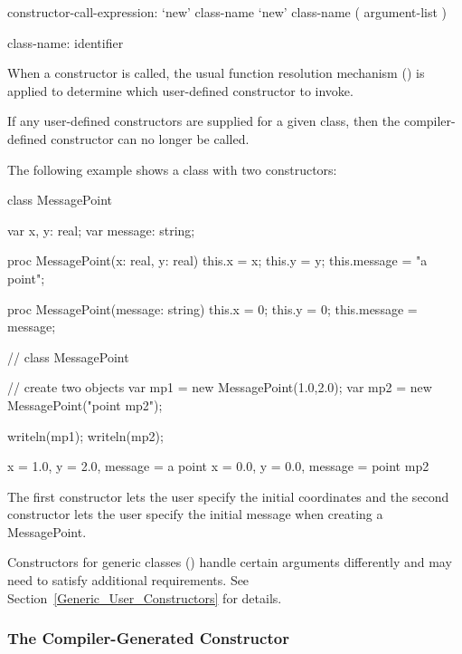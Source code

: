 \begin{syntax}
constructor-call-expression:
  `new' class-name
  `new' class-name ( argument-list )

class-name:
  identifier
\end{syntax}

When a constructor is called, the usual function resolution mechanism
() is applied to determine which
user-defined constructor to invoke.

If any user-defined constructors are supplied for a given class, then the
compiler-defined constructor can no longer be called.

\begin{example}
The following example shows a class with two constructors:
\begin{chapelpre}
\end{chapelpre}
\begin{chapel}
class MessagePoint {
  var x, y: real;
  var message: string;

  proc MessagePoint(x: real, y: real) {
    this.x = x;
    this.y = y;
    this.message = "a point";
  }

  proc MessagePoint(message: string) {
    this.x = 0;
    this.y = 0;
    this.message = message;
  }
}  // class MessagePoint

// create two objects
var mp1 = new MessagePoint(1.0,2.0);
var mp2 = new MessagePoint("point mp2");
\end{chapel}
\begin{chapelpost}
writeln(mp1);
writeln(mp2);
\end{chapelpost}
\begin{chapeloutput}
{x = 1.0, y = 2.0, message = a point}
{x = 0.0, y = 0.0, message = point mp2}
\end{chapeloutput}
The first constructor lets the user specify the initial coordinates
and the second constructor lets the user specify the initial message
when creating a MessagePoint.
\end{example}

Constructors for generic classes () handle certain
arguments differently and may need to satisfy additional
requirements. See Section~\ref{Generic_User_Constructors} for details.

\subsubsection{The Compiler-Generated Constructor}
\label{The_Compiler_Generated_Constructor}

